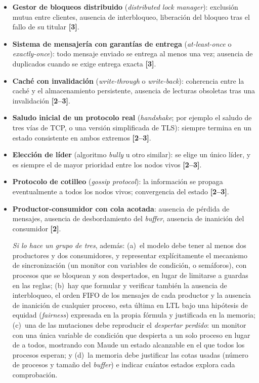 \begin{listaejercicios}
\begin{itemize}
\item
\textbf{Gestor de bloqueos distribuido} (\emph{distributed lock manager}):
exclusi\'on mutua entre clientes, ausencia de interbloqueo, liberaci\'on del
bloqueo tras el fallo de su titular \textbf{[3]}.

\item
\textbf{Sistema de mensajer\'ia con garant\'ias de entrega}
(\emph{at-least-once} o \emph{exactly-once}): todo mensaje enviado se entrega
al menos una vez; ausencia de duplicados cuando se exige entrega exacta \textbf{[3]}.

\item
\textbf{Cach\'e con invalidaci\'on} (\emph{write-through} o \emph{write-back}):
coherencia entre la cach\'e y el almacenamiento persistente, ausencia de
lecturas obsoletas tras una invalidaci\'on \textbf{[2--3]}.

\item
\textbf{Saludo inicial de un protocolo real} (\emph{handshake}; por ejemplo el
saludo de tres v\'ias de TCP, o una versi\'on simplificada de TLS): siempre
termina en un estado consistente en ambos extremos \textbf{[2--3]}.

\item
\textbf{Elecci\'on de l\'ider} (algoritmo \emph{bully} u otro similar): se elige
un \'unico l\'ider, y es siempre el de mayor prioridad entre los nodos vivos \textbf{[2--3]}.

\item
\textbf{Protocolo de cotilleo} (\emph{gossip protocol}): la informaci\'on se
propaga eventualmente a todos los nodos vivos; convergencia del estado \textbf{[2--3]}.

\item
\textbf{Productor-consumidor con cola acotada}: ausencia de p\'erdida de
mensajes, ausencia de desbordamiento del \emph{buffer}, ausencia de inanici\'on
del consumidor \textbf{[2]}.

\emph{Si lo hace un grupo de tres}, adem\'as:
(a)~el modelo debe tener al menos dos productores y dos consumidores, y
representar expl\'icitamente el mecanismo de sincronizaci\'on (un monitor con
variables de condici\'on, o sem\'aforos), con procesos que se bloquean y son
despertados, en lugar de limitarse a guardas en las reglas;
(b)~hay que formular y verificar tambi\'en la ausencia de interbloqueo, el
orden FIFO de los mensajes de cada productor y la ausencia de inanici\'on de
cualquier proceso, esta \'ultima en LTL bajo una hip\'otesis de equidad
(\emph{fairness}) expresada en la propia f\'ormula y justificada en la
memoria;
(c)~una de las mutaciones debe reproducir el \emph{despertar perdido}: un
monitor con una \'unica variable de condici\'on que despierta a un solo
proceso en lugar de a todos, mostrando con Maude un estado alcanzable en el
que todos los procesos esperan; y
(d)~la memoria debe justificar las cotas usadas (n\'umero de procesos y
tama\~no del \emph{buffer}) e indicar cu\'antos estados explora cada
comprobaci\'on.


\end{itemize}
\end{listaejercicios}
